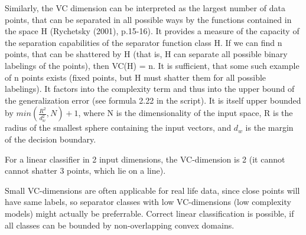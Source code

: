 \documentclass[10pt,a4paper]{article}
\begin{document}
\begin{enumerate}[a)]
Similarly, the VC dimension can be interpreted as the largest number of data points, that can be separated in all possible ways by the functions contained in the space H (Rychetsky (2001), p.15-16).
It provides a measure of the capacity of the separation capabilities of the separator function class H. If we can find n points, that can be shattered by H (that is, H can separate all possible binary labelings of the points), then VC(H) = n. It is sufficient, that some such example of n points exists (fixed points, but H must shatter them for all possible labelings). It factors into the complexity term and thus into the upper bound of the generalization error (see formula 2.22 in the script). It is itself upper bounded by $min(\frac{R^2}{d_w^2}, N) + 1$, where N is the dimensionality of the input space, R is the radius of the smallest sphere containing the input vectors, and $d_w$ is the margin of the decision boundary.

For a linear classifier in 2 input dimensions, the VC-dimension is 2 (it cannot cannot shatter 3 points, which lie on a line). 

Small VC-dimensions are often applicable for real life data, since close points will have same labels, so separator classes with low VC-dimensions (low complexity models) might actually be preferrable.
Correct linear classification is possible, if all classes can be bounded by non-overlapping convex domains.

\end{enumerate}
\clearpage
\end{document}
